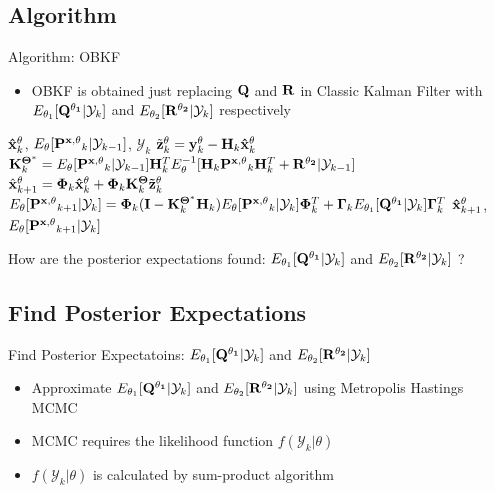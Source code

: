 \subsection{Algorithm}
\begin{frame}{Algorithm: OBKF}
\begin{itemize}
    \item OBKF is obtained just replacing ${\bf Q}$ and ${\bf R}$ in Classic Kalman Filter with $E_{\theta_1}[{\bf Q^{\theta_1}}|\mathcal{Y}_k]$ and $E_{\theta_2}[{\bf R^{\theta_2}}|\mathcal{Y}_k]$ respectively
\end{itemize}
\begin{algorithm}[H]
\caption{OBKF}
\begin{algorithmic}[1]
\REQUIRE ${\bf \hat x}^{\theta}_k$, $E_\theta[{\bf P^{x, \theta}}_{k}|\mathcal{Y}_{k-1}]$, $\mathcal{Y}_k$
\STATE $\tilde {\bf z}^{\bf \theta}_k = {\bf y}^{\bf \theta}_k - {\bf H}_k{\bf \hat x}^{\bf \theta}_k$
\STATE ${\bf K}^{\bf \Theta^*}_k = E_\theta[{\bf P^{x, \theta}}_k|\mathcal{Y}_{k-1}]{\bf H}^T_kE_\theta^{-1}[{\bf H}_k{\bf P^{x, \theta}}_k{\bf H}^T_k+{\bf R^{\theta_2}}|\mathcal{Y}_{k-1}]$
\STATE $\hat{\bf x}^{\theta}_{k+1} = {\bf \Phi}_k{\bf \hat x}^{\theta}_k+{\bf \Phi}_k{\bf K}^{\bf \Theta}_k{\bf \tilde z}^{\theta}_k$
\STATE $E_\theta[{\bf P^{x, \theta}}_{k+1}|\mathcal{Y}_k] = {\bf \Phi}_k({\bf I}-{\bf K}^{\bf \Theta^*}_k{\bf H}_k)E_\theta[{\bf P^{x, \theta}}_k|\mathcal{Y}_k]{\bf \Phi}^T_k + {\bf \Gamma}_kE_{\theta_1}[{\bf Q^{\theta_1}}|\mathcal{Y}_k]{\bf \Gamma}_k^T$
\ENSURE ${\bf \hat x}^{\theta}_{k+1}$, $E_\theta[{\bf P^{x, \theta}}_{k+1}|\mathcal{Y}_{k}]$
\end{algorithmic}
\end{algorithm}

\pause

How are the posterior expectations found: $E_{\theta_1}[{\bf Q^{\theta_1}}|\mathcal{Y}_k]$ and $E_{\theta_2}[{\bf R^{\theta_2}}|\mathcal{Y}_k]$ ?

\end{frame}

\subsection{Find Posterior Expectations}
\begin{frame}{Find Posterior Expectatoins: $E_{\theta_1}[{\bf Q^{\theta_1}}|\mathcal{Y}_k]$ and $E_{\theta_2}[{\bf R^{\theta_2}}|\mathcal{Y}_k]$}
\begin{itemize}
    \item Approximate $E_{\theta_1}[{\bf Q^{\theta_1}}|\mathcal{Y}_k]$ and $E_{\theta_2}[{\bf R^{\theta_2}}|\mathcal{Y}_k]$ using Metropolis Hastings MCMC
    \item MCMC requires the likelihood function $f(\mathcal{Y}_k|\theta)$
    \item $f(\mathcal{Y}_k|\theta)$ is calculated by sum-product algorithm\cite{Kschischang2001}
\end{itemize}
\end{frame}

